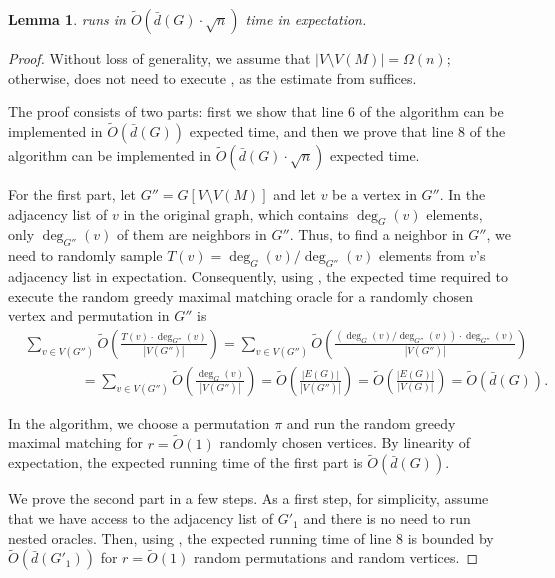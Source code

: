 \documentclass[letterpaper,11pt]{article}
\newcommand{\wt}[1]{\ensuremath{\widetilde{#1}}}
\newtheorem{lemma}{Lemma}[section]
\begin{document}
\begin{lemma}\label{lem:first-alg-time}
     runs in $\widetilde{O}( \bar{d}(G) \cdot \sqrt{n})$ time in expectation.
\end{lemma}
\begin{proof}
    Without loss of generality, we assume that $|V \setminus V(M)| = \Omega(n)$; otherwise,  does not need to execute , as the estimate from  suffices.


    The proof consists of two parts: first we show that line 6 of the algorithm can be implemented in $\wt{O}(\bar{d}(G))$ expected time, and then we prove that line 8 of the algorithm can be implemented in $\wt{O}(\bar{d}(G)\cdot \sqrt{n})$ expected time.

    For the first part, let $G'' = G[V \setminus V(M)]$ and let $v$ be a vertex in $G''$. In the adjacency list of $v$ in the original graph, which contains $\deg_G(v)$ elements, only $\deg_{G''}(v)$ of them are neighbors in $G''$. Thus, to find a neighbor in $G''$, we need to randomly sample $T(v) = \deg_G(v) / \deg_{G''}(v)$ elements from $v$'s adjacency list in expectation. Consequently, using , the expected time required to execute the random greedy maximal matching oracle for a randomly chosen vertex and permutation in $G''$ is
    \begin{align*}
        &\sum_{v \in V(G'')} 
    \wt{O}\left(\frac{T(v) \cdot \deg_{G''}(v)}{|V(G'')|}\right) = \sum_{v \in V(G'')} 
    \wt{O}\left(\frac{(\deg_G(v)/\deg_{G''}(v)) \cdot \deg_{G''}(v)}{|V(G'')|}\right)\\
    &\qquad \qquad = \sum_{v \in V(G'')} 
    \wt{O}\left(\frac{\deg_G(v)}{| V(G'')|}\right)
    = \wt{O}\left(\frac{|E(G)|}{|V(G'')|}\right)
    = \wt{O}\left(\frac{|E(G)|}{|V(G)|}\right)
     = \widetilde{O}(\bar{d}(G)) .
    \end{align*}

    In the algorithm, we choose a permutation $\pi$ and run the random greedy maximal matching for $r = \wt{O}(1)$ randomly chosen vertices. By linearity of expectation, the expected running time of the first part is $\widetilde{O}(\bar{d}(G))$.


    We prove the second part in a few steps. As a first step, for simplicity, assume that we have access to the adjacency list of $G'_1$ and there is no need to run nested oracles. Then, using , the expected running time of line 8 is bounded by $\wt{O}(\bar{d}(G'_1))$ for $r = \wt{O}(1)$ random permutations and random vertices. 
    

\end{proof}
\end{document}
